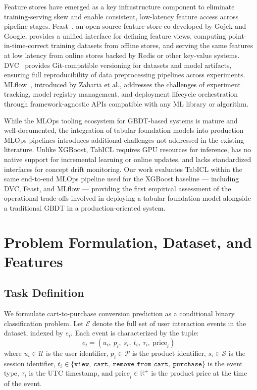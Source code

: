 \documentclass[conference]{IEEEtran}
\begin{document}
Feature stores have emerged as a key infrastructure component to
eliminate training-serving skew and enable consistent, low-latency
feature access across pipeline stages. Feast~\cite{feast2019}, an
open-source feature store co-developed by Gojek and Google, provides a
unified interface for defining feature views, computing
point-in-time-correct training datasets from offline stores, and serving
the same features at low latency from online stores backed by Redis or
other key-value systems. DVC~\cite{kuprieiev2021dvc} provides
Git-compatible versioning for datasets and model artifacts, ensuring full
reproducibility of data preprocessing pipelines across experiments.
MLflow~\cite{zaharia2018mlflow}, introduced by Zaharia et al., addresses
the challenges of experiment tracking, model registry management, and
deployment lifecycle orchestration through framework-agnostic APIs
compatible with any ML library or algorithm.

While the MLOps tooling ecosystem for GBDT-based systems is mature and
well-documented, the integration of tabular foundation models into
production MLOps pipelines introduces additional challenges not addressed
in the existing literature. Unlike XGBoost, TabICL requires GPU
resources for inference, has no native support for incremental learning
or online updates, and lacks standardized interfaces for concept drift
monitoring. Our work evaluates TabICL within the same end-to-end MLOps
pipeline used for the XGBoost baseline --- including DVC, Feast, and
MLflow --- providing the first empirical assessment of the operational
trade-offs involved in deploying a tabular foundation model alongside a
traditional GBDT in a production-oriented system.



\section{Problem Formulation, Dataset, and Features}

\subsection{Task Definition}

We formulate cart-to-purchase conversion prediction as a conditional
binary classification problem. Let $\mathcal{E}$ denote the full set of
user interaction events in the dataset, indexed by $e_i$. Each event is
characterized by the tuple:
%
\begin{equation}
  e_i = (u_i,\ p_i,\ s_i,\ t_i,\ \tau_i,\ \mathrm{price}_i)
  \label{eq:event}
\end{equation}
%
where $u_i \in \mathcal{U}$ is the user identifier, $p_i \in \mathcal{P}$
is the product identifier, $s_i \in \mathcal{S}$ is the session
identifier, $t_i \in \{\texttt{view},\ \texttt{cart},\
\texttt{remove\_from\_cart},\ \texttt{purchase}\}$ is the event type,
$\tau_i$ is the UTC timestamp, and $\mathrm{price}_i \in \mathbb{R}^{+}$
is the product price at the time of the event.
\end{document}

